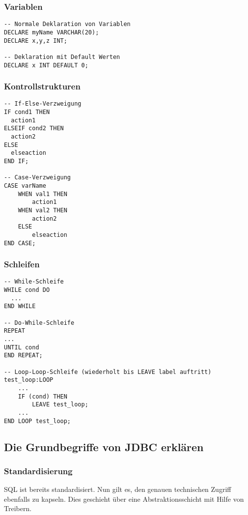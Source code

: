 \subsubsection{Variablen}
\begin{lstlisting}[caption={Variabeln},label=lst:vars]
-- Normale Deklaration von Variablen
DECLARE myName VARCHAR(20); 
DECLARE x,y,z INT;

-- Deklaration mit Default Werten
DECLARE x INT DEFAULT 0;
\end{lstlisting}

\newpage

\subsubsection{Kontrollstrukturen}
\begin{lstlisting}[caption={Verzweigung},label=lst:if]
-- If-Else-Verzweigung
IF cond1 THEN
  action1
ELSEIF cond2 THEN
  action2
ELSE
  elseaction
END IF;

-- Case-Verzweigung
CASE varName
	WHEN val1 THEN 
		action1
	WHEN val2 THEN 
		action2
	ELSE 
		elseaction
END CASE;
\end{lstlisting}

\subsubsection{Schleifen}

\begin{lstlisting}[caption={Schleifen},label=lst:loops_while]
-- While-Schleife
WHILE cond DO
  ...
END WHILE

-- Do-While-Schleife
REPEAT
...
UNTIL cond
END REPEAT;

-- Loop-Loop-Schleife (wiederholt bis LEAVE label auftritt)
test_loop:LOOP
	...
	IF (cond) THEN
		LEAVE test_loop;
	...
END LOOP test_loop;
\end{lstlisting}

\subsection{Die Grundbegriffe von JDBC erklären}

\subsubsection{Standardisierung}

SQL ist bereits standardisiert. Nun gilt es, den genauen technischen Zugriff ebenfalls zu kapseln. Dies geschieht über eine Abstraktionsschicht mit Hilfe von Treibern.

